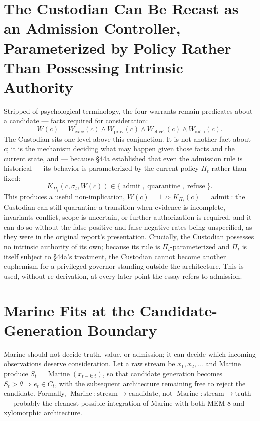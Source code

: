 \documentclass[12pt]{article}
\begin{document}
\section{The Custodian Can Be Recast as an Admission Controller, Parameterized by Policy Rather Than Possessing Intrinsic Authority}

Stripped of psychological terminology, the four warrants remain predicates about a candidate — facts required for consideration:
\[
W(c)=W_{\mathrm{exec}}(c)\land W_{\mathrm{prov}}(c)\land W_{\mathrm{effect}}(c)\land W_{\mathrm{auth}}(c).
\]
The Custodian sits one level above this conjunction. It is not another fact about $c$; it is the mechanism deciding what may happen given those facts and the current state, and — because \S44a established that even the admission rule is historical — its behavior is parameterized by the current policy $\Pi_t$ rather than fixed:
\[
K_{\Pi_t}(c,\sigma_t,W(c))\in\{\operatorname{admit},\operatorname{quarantine},\operatorname{refuse}\}.
\]
This produces a useful non-implication, $W(c)=1\not\Rightarrow K_{\Pi_t}(c)=\operatorname{admit}$: the Custodian can still quarantine a transition when evidence is incomplete, invariants conflict, scope is uncertain, or further authorization is required, and it can do so without the false-positive and false-negative rates being unspecified, as they were in the original report's presentation. Crucially, the Custodian possesses no intrinsic authority of its own; because its rule is $\Pi_t$-parameterized and $\Pi_t$ is itself subject to \S44a's treatment, the Custodian cannot become another euphemism for a privileged governor standing outside the architecture. This is used, without re-derivation, at every later point the essay refers to admission.

\section{Marine Fits at the Candidate-Generation Boundary}

Marine should not decide truth, value, or admission; it can decide which incoming observations deserve consideration. Let a raw stream be $x_1,x_2,\dots$ and Marine produce $S_t=\operatorname{Marine}(x_{t-k:t})$, so that candidate generation becomes $S_t>\theta\Rightarrow e_t\in C_t$, with the subsequent architecture remaining free to reject the candidate. Formally, $\operatorname{Marine}:\text{stream}\to\text{candidate}$, not $\operatorname{Marine}:\text{stream}\to\text{truth}$ — probably the cleanest possible integration of Marine with both MEM-8 and xylomorphic architecture.
\end{document}
